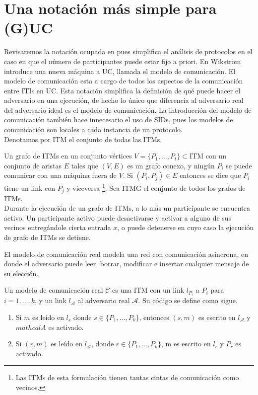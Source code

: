 \section{Una notación más simple para (G)UC}
Revisaremos la notación ocupada en \cite{mnCompleto} pues simplifica el análisis de protocolos en el caso
en que el número de participantes puede estar fijo a priori. En \cite{mnCompleto} Wikstr\"om introduce una
nueva máquina a UC, llamada el modelo de comunicación. El modelo de comunicación esta a cargo de todos los
aspectos de la comunicación entre ITIs en UC. Esta notación simplifica la definición de qué puede hacer el
adversario en una ejecución, de hecho lo único que diferencia al adversario real del adversario 
ideal es el modelo de comunicación. La introducción del modelo de comunicación también hace innecesario
el uso de SIDs, pues los modelos de comunicación son locales a cada instancia de un protocolo.\\
Denotamos por $\textrm{ITM}$ el conjunto de todas las ITMs.

\begin{definicion}
Un grafo de ITMs en un conjunto vértices $V = \{P_1, \ldots, P_t\} \subset \textrm{ITM}$ con un conjunto
de aristas $E$ tales que $(V, E)$ es un grafo conexo, y ningún $P_i$ se puede comunicar con una máquina
fuera de $V$. Si $(P_i, P_j)\in E$ entonces se dice que $P_i$ tiene un link con $P_j$ y viceversa
\footnote{Las ITMs de esta formulación tienen tantas cintas de comunicación como vecinos.}.
Sea ITMG el conjunto de todos los grafos de ITMs.\\
Durante la ejecución de un grafo de ITMs, a lo más un participante se encuentra activo. Un participante
activo puede desactivarse y activar a alguno de sus vecinos entregándole cierta entrada $x$, o puede
detenerse en cuyo caso la ejecución de grafo de ITMs se detiene.
\end{definicion}

El modelo de comunicación real modela una red con comunicación asíncrona, en donde el adversario
puede leer, borrar, modificar e insertar cualquier mensaje de su elección.

\begin{definicion}
Un modelo de comunicación real $\mathcal{C}$ es una ITM con un link $l_{P_i}$ a $P_i$
para $i = 1, \ldots, k$, y un link $l_\mathcal{A}$ al adversario real $\mathcal{A}$.
Su código se define como sigue.
\begin{enumerate}
  \item Si $m$ es leído en $l_s$ donde $s \in \{P_1, \ldots, P_k\}$, entonces $(s, m)$ es
        escrito en $l_\mathcal{A}$ y $mathcal{A}$ es activado.
  \item Si $(r, m)$ es leído en $l_\mathcal{A}$, donde $r \in \{P_1, \ldots, P_k\}$,
        m es escrito en $l_r$ y $P_r$ es activado.
\end{enumerate}
\end{definicion}

